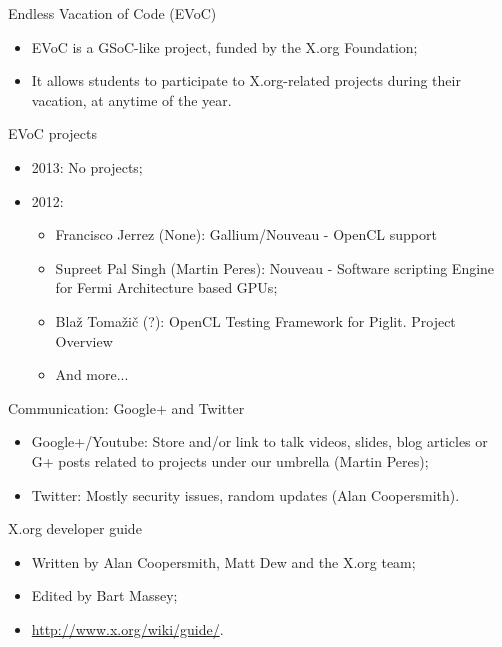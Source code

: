 \documentclass{beamer}
\begin{document}
		\begin{frame}
			\begin{block}{Endless Vacation of Code (EVoC)}
				\begin{itemize}
					\item EVoC is a GSoC-like project, funded by the X.org Foundation;
					\item It allows students to participate to
X.org-related projects during their vacation, at anytime of the year.
				\end{itemize}
			\end{block}

			\begin{block}{EVoC projects}
				\begin{itemize}
					\item 2013: No projects;
					\item 2012:
					\begin{itemize}
						\item Francisco Jerrez (None): Gallium/Nouveau - OpenCL support
						\item Supreet Pal Singh (Martin Peres): Nouveau - Software scripting Engine for Fermi Architecture based GPUs;
						\item Blaž Tomažič (?): OpenCL Testing Framework for Piglit. Project Overview 
						\item And more...
					\end{itemize}
				\end{itemize}
			\end{block}
		\end{frame}

		\begin{frame}
			\begin{block}{Communication: Google+ and Twitter}
				\begin{itemize}
					\item Google+/Youtube: Store and/or link
to talk videos, slides, blog articles or G+ posts related to projects under our umbrella (Martin Peres);
					\item Twitter: Mostly security issues, random updates (Alan Coopersmith).
				\end{itemize}
			\end{block}

			\begin{block}{X.org developer guide}
				\begin{itemize}
					\item Written by Alan Coopersmith, Matt Dew and the X.org team;
					\item Edited by Bart Massey;
					\item \url{http://www.x.org/wiki/guide/}.
				\end{itemize}
			\end{block}
		\end{frame}
\end{document}

